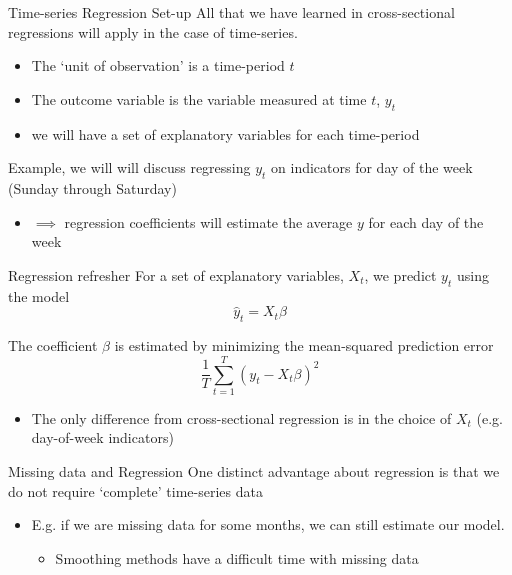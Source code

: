 \documentclass[aspectratio=169,t,11pt,table]{beamer}
\begin{document}
\begin{frame}{Time-series Regression Set-up}
  All that we have learned in cross-sectional regressions will apply in the case of time-series. 
  \begin{itemize}
    \item The `unit of observation' is a time-period $t$
    \item The outcome variable is the variable measured at time $t$, $y_t$
    \item we will have a set of explanatory variables for each time-period
  \end{itemize}

  \bigskip
  Example, we will will discuss regressing $y_t$ on indicators for day of the week (Sunday through Saturday)
  \begin{itemize}
    \item $\implies$ regression coefficients will estimate the average $y$ for each day of the week
  \end{itemize}
\end{frame}

\begin{frame}{Regression refresher}
  For a set of explanatory variables, $X_t$, we predict $y_t$ using the model
  $$
    \hat{y}_t = X_t \beta
  $$

  \bigskip
  The coefficient $\beta$ is estimated by minimizing the mean-squared prediction error
  $$
    \frac{1}{T} \sum_{t=1}^T (y_t - X_t \beta)^2
  $$
  \begin{itemize}
    \item The only difference from cross-sectional regression is in the choice of $X_t$ (e.g. day-of-week indicators)
  \end{itemize}
\end{frame}

\begin{frame}{Missing data and Regression}
  One distinct advantage about regression is that we do not require `complete' time-series data
  \begin{itemize}
    \item E.g. if we are missing data for some months, we can still estimate our model. 
    \begin{itemize}
      \item Smoothing methods have a difficult time with missing data
    \end{itemize}
  \end{itemize}
\end{frame}
\end{document}
